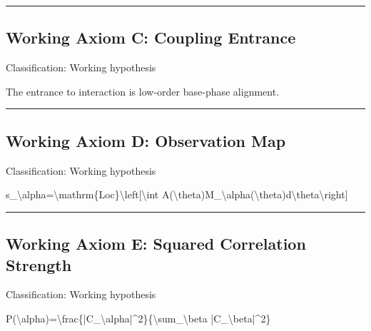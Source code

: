 \documentclass[
  a4paper]{article}
\newenvironment{Shaded}{}{}
\newcommand{\NormalTok}[1]{#1}
\begin{document}
\begin{center}\rule{0.5\linewidth}{0.5pt}\end{center}

\subsection{Working Axiom C: Coupling
Entrance}\label{working-axiom-c-coupling-entrance}

Classification: Working hypothesis

The entrance to interaction is low-order base-phase alignment.

\begin{center}\rule{0.5\linewidth}{0.5pt}\end{center}

\subsection{Working Axiom D: Observation
Map}\label{working-axiom-d-observation-map}

Classification: Working hypothesis

\begin{Shaded}
\begin{Highlighting}[]
\NormalTok{s\_\textbackslash{}alpha=\textbackslash{}mathrm\{Loc\}\textbackslash{}left[\textbackslash{}int A(\textbackslash{}theta)M\_\textbackslash{}alpha(\textbackslash{}theta)d\textbackslash{}theta\textbackslash{}right]}
\end{Highlighting}
\end{Shaded}

\begin{center}\rule{0.5\linewidth}{0.5pt}\end{center}

\subsection{Working Axiom E: Squared Correlation
Strength}\label{working-axiom-e-squared-correlation-strength}

Classification: Working hypothesis

\begin{Shaded}
\begin{Highlighting}[]
\NormalTok{P(\textbackslash{}alpha)=\textbackslash{}frac\{|C\_\textbackslash{}alpha|\^{}2\}\{\textbackslash{}sum\_\textbackslash{}beta |C\_\textbackslash{}beta|\^{}2\}}
\end{Highlighting}
\end{Shaded}
\end{document}
